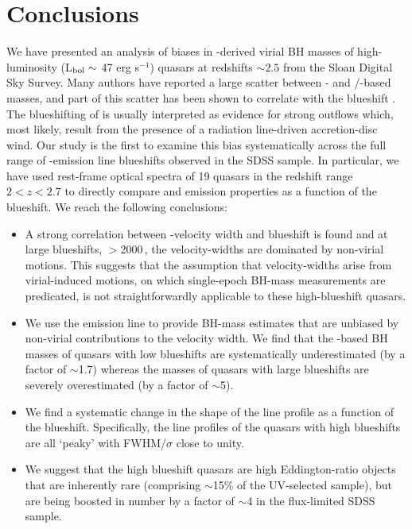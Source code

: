 \section{Conclusions}
\label{sec:conclusions}

We have presented an analysis of biases in -derived virial BH masses of high-luminosity (L$_{\rm{bol}} \sim$ 47 erg s$^{-1}$) quasars at redshifts $\sim2.5$ from the Sloan Digital Sky Survey. 
Many authors have reported a large scatter between - and \hans/\hbns-based masses, and part of this scatter has been shown to correlate with the  blueshift \citep{shen12}.
The blueshifting of  is usually interpreted as evidence for strong outflows which, most likely, result from the presence of a radiation line-driven accretion-disc wind. 
Our study is the first to examine this bias systematically across the full range of -emission line blueshifts observed in the SDSS sample. 
In particular, we have used rest-frame optical spectra of 19 quasars in the redshift range $2 < z < 2.7$ to directly compare  and \ha emission properties as a function of the  blueshift. 
We reach the following conclusions:

\begin{itemize}

\item{A strong correlation between -velocity width and blueshift is found and at large blueshifts, $>$2000\,\kms, the velocity-widths are dominated by non-virial motions. 
This suggests that the assumption that velocity-widths arise from virial-induced motions, on which single-epoch BH-mass measurements are predicated, is not straightforwardly applicable to these high-blueshift quasars.}

\item{We use the \ha emission line to provide BH-mass estimates that are unbiased by non-virial contributions to the velocity width. 
We find that the -based BH masses of quasars with low  blueshifts are systematically underestimated (by a factor of $\sim$1.7) whereas the masses of quasars with large blueshifts are severely overestimated (by a factor of $\sim$5).} 

\item{We find a systematic change in the shape of the \ha line profile as a function of the  blueshift. 
Specifically, the \ha line profiles of the quasars with high  blueshifts are all `peaky' with FWHM/$\sigma$ close to unity.} 

\item{We suggest that the high  blueshift quasars are high Eddington-ratio objects that are inherently rare (comprising $\sim$15\% of the UV-selected sample), but are being boosted in number by a factor of $\sim$4 in the flux-limited SDSS sample.}

\end{itemize}

